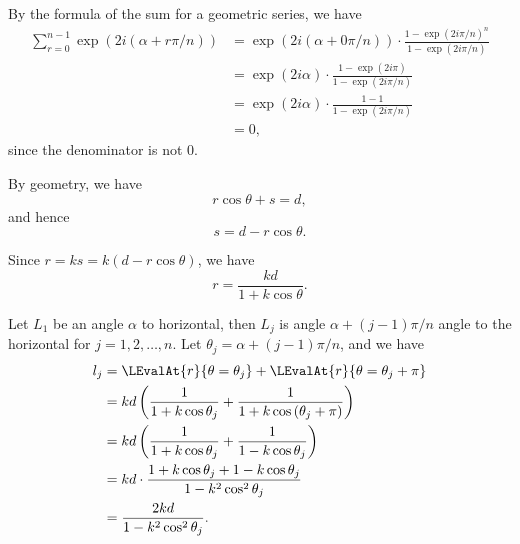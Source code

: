 \Question{\currfilebase}

By the formula of the sum for a geometric series, we have
\begin{align*}
    \sum_{r = 0}^{n - 1} \exp(2i (\alpha + r\pi / n)) & = \exp(2i (\alpha + 0\pi / n)) \cdot \frac{1 - \exp(2 i \pi / n)^ n}{1 - \exp(2 i \pi / n)} \\
                                                      & = \exp(2 i \alpha) \cdot \frac{1 - \exp(2 i \pi)}{1 - \exp(2 i \pi / n)}                    \\
                                                      & = \exp(2 i \alpha) \cdot \frac{1 - 1}{1 - \exp(2 i \pi / n)}                                \\
                                                      & = 0,
\end{align*}
since the denominator is not \(0\).

By geometry, we have
\[
    r \cos \theta + s = d,
\]
and hence
\[
    s = d - r \cos \theta.
\]

Since \(r = ks = k(d - r \cos \theta)\), we have
\[
    r = \frac{kd}{1 + k \cos \theta}.
\]

Let \(L_1\) be an angle \(\alpha\) to horizontal, then \(L_j\) is angle \(\alpha + (j - 1)\pi / n\) angle to the horizontal for \(j = 1, 2, \ldots, n\). Let \(\theta_j = \alpha + (j - 1)\pi / n\), and we have
\begin{align*}
    l_j & = \LEvalAt{r}{\theta = \theta_j} + \LEvalAt{r}{\theta = \theta_j + \pi}                            \\
        & = kd \left(\frac{1}{1 + k \cos \theta_j} + \frac{1}{1 + k \cos \left(\theta_j + \pi\right)}\right) \\
        & = kd \left(\frac{1}{1 + k \cos \theta_j} + \frac{1}{1 - k \cos \theta_j}\right)                    \\
        & = kd \cdot \frac{1 + k \cos \theta_j + 1 - k \cos \theta_j}{1 - k^2 \cos^2 \theta_j}               \\
        & = \frac{2kd}{1 - k^2 \cos^2 \theta_j}.
\end{align*}

